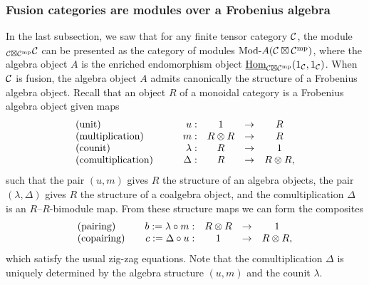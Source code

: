 \documentclass{amsart}
\begin{document}
\subsubsection{Fusion categories are modules over a Frobenius algebra}

In the last subsection, we saw that for any finite tensor category $\mathcal C$, the module ${}_{\mathcal C \boxtimes \mathcal C^{\mathrm{mp}}} \mathcal C$ can be presented as the category of modules $\Mod{}{A}(\cC \boxtimes \cC^\mp)$, where the algebra object $A$ is the enriched endomorphism object $\operatorname{\underline{Hom}}_{\mathcal C \boxtimes \mathcal C^{\mathrm{mp}}}(1_\mathcal C,1_\mathcal C)$.  When $\mathcal C$ is fusion, the algebra object $A$ admits canonically the structure of a Frobenius algebra object.  Recall that an object $R$ of a monoidal category is a Frobenius algebra object given maps
\begin{equation*}
	\begin{array}{l c  r c c c}
		\textrm{(unit)} & \quad & u: & 1 & \to & R \\
		\textrm{(multiplication)} && m: & R \otimes R & \to & R \\
		\textrm{(counit)} && \lambda: & R &\to &1 \\
		\textrm{(comultiplication)} && \Delta: & R &\to& R \otimes R,
	\end{array}
\end{equation*}
such that the pair $(u,m)$ gives $R$ the structure of an algebra objects, the pair $(\lambda, \Delta)$ gives $R$ the structure of a coalgebra object, and the comultiplication $\Delta$ is an $R$--$R$-bimodule map.  From these structure maps we can form the composites
\begin{equation*}
	\begin{array}{l c  r c c c}
		\textrm{(pairing)} && b := \lambda \circ m: & R \otimes R& \to& 1 \\
		\textrm{(copairing)} && c := \Delta \circ u: & 1&\to&  R \otimes R,
	\end{array}
\end{equation*}
which satisfy the usual zig-zag equations.  Note that the comultiplication $\Delta$ is uniquely determined by the algebra structure $(u,m)$ and the counit $\lambda$.
\end{document}
